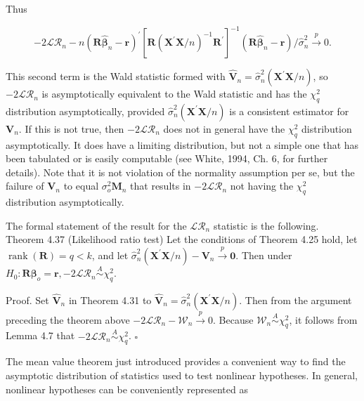 \documentclass[10pt]{article}
\begin{document}
Thus

$$
-2 \mathcal{L} \mathcal{R}_{n}-n\left(\mathbf{R} \hat{\boldsymbol{\beta}}_{n}-\mathbf{r}\right)^{\prime}\left[\mathbf{R}\left(\mathbf{X}^{\prime} \mathbf{X} / n\right)^{-1} \mathbf{R}^{\prime}\right]^{-1}\left(\mathbf{R} \hat{\boldsymbol{\beta}}_{n}-\mathbf{r}\right) / \hat{\sigma}_{n}^{2} \xrightarrow{p} 0 .
$$

This second term is the Wald statistic formed with $\hat{\mathbf{V}}_{n}=\hat{\sigma}_{n}^{2}\left(\mathbf{X}^{\prime} \mathbf{X} / n\right)$, so $-2 \mathcal{L} \mathcal{R}_{n}$ is asymptotically equivalent to the Wald statistic and has the $\chi_{q}^{2}$ distribution asymptotically, provided $\hat{\sigma}_{n}^{2}\left(\mathbf{X}^{\prime} \mathbf{X} / n\right)$ is a consistent estimator for $\mathbf{V}_{n}$. If this is not true, then $-2 \mathcal{L} \mathcal{R}_{n}$ does not in general have the $\chi_{q}^{2}$ distribution asymptotically. It does have a limiting distribution, but not a simple one that has been tabulated or is easily computable (see White, 1994, Ch. 6, for further details). Note that it is not violation of the normality assumption per se, but the failure of $\mathbf{V}_{n}$ to equal $\sigma_{o}^{2} \mathbf{M}_{n}$ that results in $-2 \mathcal{L} \mathcal{R}_{n}$ not having the $\chi_{q}^{2}$ distribution asymptotically.

The formal statement of the result for the $\mathcal{L} \mathcal{R}_{n}$ statistic is the following.\\
Theorem 4.37 (Likelihood ratio test) Let the conditions of Theorem 4.25 hold, let $\operatorname{rank}(\mathbf{R})=q<k$, and let $\hat{\sigma}_{n}^{2}\left(\mathbf{X}^{\prime} \mathbf{X} / n\right)-\mathbf{V}_{n} \xrightarrow{p} \mathbf{0}$. Then under $H_{0}: \mathbf{R} \boldsymbol{\beta}_{o}=\mathbf{r},-2 \mathcal{L} \mathcal{R}_{n} \stackrel{A}{\sim} \chi_{q}^{2}$.

Proof. Set $\hat{\mathbf{V}}_{n}$ in Theorem 4.31 to $\hat{\mathbf{V}}_{n}=\hat{\sigma}_{n}^{2}\left(\mathbf{X}^{\prime} \mathbf{X} / n\right)$. Then from the argument preceding the theorem above $-2 \mathcal{L} \mathcal{R}_{n}-\mathcal{W}_{n} \xrightarrow{p} 0$. Because $\mathcal{W}_{n} \stackrel{A}{\sim} \chi_{q}^{2}$, it follows from Lemma 4.7 that $-2 \mathcal{L} \mathcal{R}_{n} \stackrel{A}{\sim} \chi_{q}^{2}$. \(\square\)

The mean value theorem just introduced provides a convenient way to find the asymptotic distribution of statistics used to test nonlinear hypotheses. In general, nonlinear hypotheses can be conveniently represented as
\end{document}
